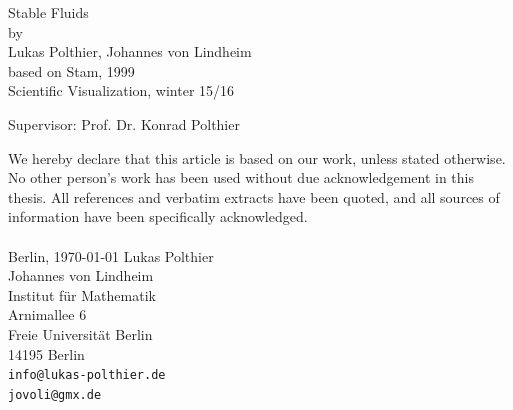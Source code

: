 \documentclass[a4paper,10pt,oneside,final,german,openbib,pdftex,titlepage]{scrbook}
\begin{document}

\linespread{0.9}

\begin{titlepage}

  \vspace*{6mm}
  \begin{center}
     {\afont Stable Fluids}
     \\[3.5cm]
     {\large by}
     \\[3.5cm]
     {\dfont Lukas Polthier, Johannes von Lindheim}\\
     {based on Stam, 1999}
     \\[2cm]
     {\large Scientific Visualization, winter 15/16\/\\
}
   \end{center}
   \vfill
   Supervisor: Prof. Dr. Konrad Polthier\\	
   \vfill
   
   
\end{titlepage}

\newpage
\mbox{}
\thispagestyle{empty}

\newpage
\thispagestyle{empty}
We hereby declare that this article is based on our work, unless stated otherwise. No other person’s work has been used without due acknowledgement in this thesis. All references and verbatim extracts have been quoted, and all sources of information have been specifically acknowledged. 
\\
\\[3.5cm] 
Berlin, \today
\vfill
\noindent 
Lukas Polthier\\
Johannes von Lindheim\\
Institut f\"ur Mathematik\\
Arnimallee 6\\
Freie Universit\"at Berlin\\
14195 Berlin\\
{\tt info@lukas-polthier.de\\
\tt jovoli@gmx.de}

\thispagestyle{empty}
\renewcommand\contentsname{Table of Contents}
\thispagestyle{empty}
\renewcommand\figurename{Figure}
\renewcommand\tablename{Tabelle}
\thispagestyle{empty}
\tableofcontents
\thispagestyle{empty}
\clearpage
\thispagestyle{empty}
\end{document}

